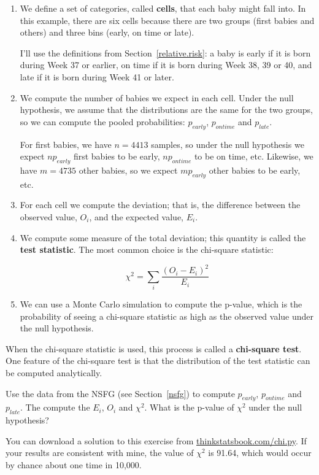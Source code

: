\documentclass[12pt]{book}
\begin{document}
\begin{enumerate}

\item We define a set of categories, called {\bf cells}, that each
  baby might fall into.  In this example, there are six cells because
  there are two groups (first babies and others) and three bins
  (early, on time or late).

I'll use the definitions from Section~\ref{relative.risk}: a baby is
early if it is born during Week 37 or earlier, on time if it is born
during Week 38, 39 or 40, and late if it is born during Week 41 or
later.

\item We compute the number of babies we expect in each cell.  Under
  the null hypothesis, we assume that the distributions are the same
  for the two groups, so we can compute the pooled probabilities:
  $p_{early}$, $p_{ontime}$ and $p_{late}$.

For first babies, we have $n=4413$ samples, so under the null hypothesis
we expect $n p_{early}$ first babies to be early, $n p_{ontime}$ to be
on time, etc.  Likewise, we have $m=4735$ other babies, so we expect
$m p_{early}$ other babies to be early, etc.

\item For each cell we compute the deviation; that is, the difference
  between the observed value, $O_i$, and the expected value, $E_i$.

\item We compute some measure of the total deviation; this quantity
is called the {\bf test statistic}.  The most common
choice is the chi-square statistic:

  \[ \chi^2 = \sum_i \frac{(O_i - E_i)^2}{E_i} \]


\item We can use a Monte Carlo simulation to compute the p-value,
  which is the probability of seeing a chi-square statistic as high
  as the observed value under the null hypothesis.

\end{enumerate}

When the chi-square statistic is used, this process is called a 
{\bf chi-square test}.  One feature of the chi-square test is that
the distribution of the test statistic can be computed analytically.

\begin{ex}

Use the data from the NSFG (see Section~\ref{nsfg}) to compute
$p_{early}$, $p_{ontime}$ and $p_{late}$.  The compute the $E_i$,
$O_i$ and $\chi^2$.  What is the p-value of $\chi^2$ under the null
hypothesis?

You can download a solution to this exercise from
\url{thinkstatsbook.com/chi.py}.
If your results are consistent with mine, the value of $\chi^2$ is 91.64,
which would occur by chance about one time in 10,000.

\end{ex}
\end{document}
